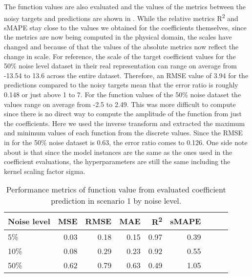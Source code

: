 The function values are also evaluated and the values of the metrics between the noisy targets and predictions are shown in . While the relative metrics R\textsuperscript{2} and sMAPE stay close to the values we obtained for the coefficients themselves, since the metrics are now being computed in the physical domain, the scales have changed and because of that the values of the absolute metrics now reflect the change in scale. For reference, the scale of the target coefficient values for the 50\% noise level dataset in their real representation can range on average from -13.54 to 13.6 across the entire dataset. Therefore, an RMSE value of 3.94 for the predictions compared to the noisy targets mean that the error ratio is roughly 0.148 or just above 1 to 7. For the function values of the 50\% noise dataset the values range on average from -2.5 to 2.49. This was more difficult to compute since there is no direct way to compute the amplitude of the function from just the coefficients. Here we used the inverse transform and extracted the maximum and minimum values of each function from the discrete values. Since the RMSE in  for the 50\% noise dataset is 0.63, the error ratio comes to 0.126. One side note about  is that since the model instances are the same as the ones used in the coefficient evaluations, the hyperparameters are still the same including the kernel scaling factor sigma.
\begin{table}[H]
  \caption{Performance metrics of function value from evaluated coefficient prediction in scenario 1 by noise level.}\label{table:scenario_1_function_metrics}
  \centering
  \begin{tabular}{lrrrrrrrr}
    \toprule
    Noise level & MSE  & RMSE & MAE  & R\textsuperscript{2}   & sMAPE \\
    \midrule
    5\%         & 0.03 & 0.18 & 0.15 & 0.97 & 0.39  \\
    10\%        & 0.08 & 0.29 & 0.23 & 0.92 & 0.55  \\
    50\%        & 0.62 & 0.79 & 0.63 & 0.49 & 1.05  \\
    \bottomrule
  \end{tabular}
\end{table}

